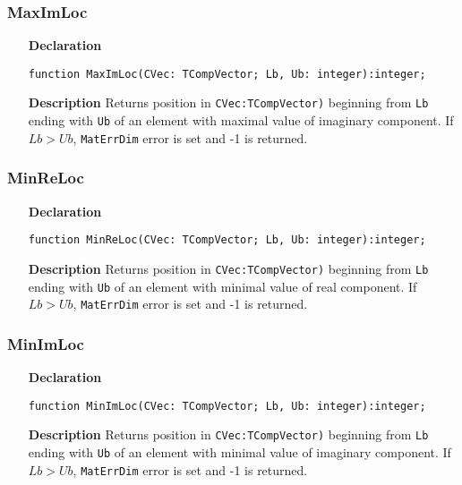 \documentclass[12pt,a4paper,oneside]{report}
\newcommand{\declarationitem}[1]{\textbf{#1}}
\newcommand{\descriptiontitle}[1]{\textbf{#1}}
\newcommand{\code}[1]{\texttt{#1}}
\begin{document}
\subsubsection{MaxImLoc}
\label{maximloc}
\begin{itemize}
	\item[\declarationitem{Declaration}\hfill]
	\begin{flushleft}
		\code{function MaxImLoc(CVec: TCompVector; Lb, Ub: integer):integer;}		
	\end{flushleft}
	\item[\descriptiontitle{Description}]
	Returns position in \code{CVec:TCompVector)} beginning from \code{Lb} ending with \code{Ub} of an element with maximal value of imaginary component.  If $Lb > Ub$, \code{MatErrDim} error is set and -1 is returned.  
\end{itemize}	
\subsubsection{MinReLoc}
\label{minreloc}
\begin{itemize}
	\item[\declarationitem{Declaration}\hfill]
	\begin{flushleft}
		\code{function MinReLoc(CVec: TCompVector; Lb, Ub: integer):integer;}		
	\end{flushleft}
	\item[\descriptiontitle{Description}]
	Returns position in \code{CVec:TCompVector)} beginning from \code{Lb} ending with \code{Ub} of an element with minimal value of real component.  If $Lb > Ub$, \code{MatErrDim} error is set and -1 is returned.  
\end{itemize}	
\subsubsection{MinImLoc}
\label{minimloc}
\begin{itemize}
	\item[\declarationitem{Declaration}\hfill]
	\begin{flushleft}
		\code{function MinImLoc(CVec: TCompVector; Lb, Ub: integer):integer;}		
	\end{flushleft}
	\item[\descriptiontitle{Description}]
	Returns position in \code{CVec:TCompVector)} beginning from \code{Lb} ending with \code{Ub} of an element with minimal value of imaginary component.  If $Lb > Ub$, \code{MatErrDim} error is set and -1 is returned.  
\end{itemize}	
\end{document}
